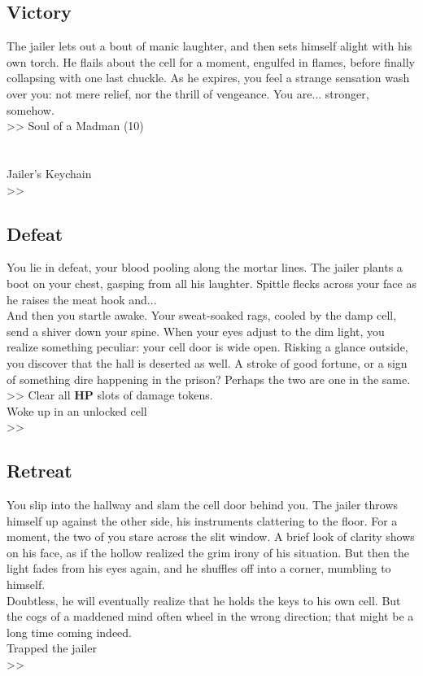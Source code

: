 \subsection*{Victory}
The jailer lets out a bout of manic laughter, and then sets himself alight with his own torch. He flails about the cell for a moment, engulfed in flames, before finally collapsing with one last chuckle. As he expires, you feel a strange sensation wash over you: not mere relief, nor the thrill of vengeance. You are... stronger, somehow.\\
>> Soul of a Madman (10)\\
\\
\\
 Jailer’s Keychain\\
>> 

\subsection*{Defeat}
You lie in defeat, your blood pooling along the mortar lines. The jailer plants a boot on your chest, gasping from all his laughter. Spittle flecks across your face as he raises the meat hook and...\\

And then you startle awake. Your sweat-soaked rags, cooled by the damp cell, send a shiver down your spine. When your eyes adjust to the dim light, you realize something peculiar: your cell door is wide open. Risking a glance outside, you discover that the hall is deserted as well. A stroke of good fortune, or a sign of something dire happening in the prison? Perhaps the two are one in the same.\\

>> Clear all \textbf{HP} slots of damage tokens.\\
 Woke up in an unlocked cell\\
>> 

\subsection*{Retreat}
You slip into the hallway and slam the cell door behind you. The jailer throws himself up against the other side, his instruments clattering to the floor. For a moment, the two of you stare across the slit window. A brief look of clarity shows on his face, as if the hollow realized the grim irony of his situation. But then the light fades from his eyes again, and he shuffles off into a corner, mumbling to himself.\\

Doubtless, he will eventually realize that he holds the keys to his own cell. But the cogs of a maddened mind often wheel in the wrong direction; that might be a long time coming indeed.\\

 Trapped the jailer\\
>> 